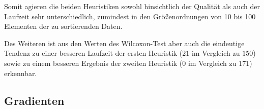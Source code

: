 \documentclass[a4paper, 10pt, twoside, onecolumn, parskip]{scrartcl}
\begin{document}
    Somit agieren die beiden Heuristiken sowohl hinsichtlich der Qualität als auch der Laufzeit sehr unterschiedlich, zumindest in den Größenordnungen von 10 bis 100 Elementen der zu sortierenden Daten.

    Des Weiteren ist aus den Werten des Wilcoxon-Test aber auch die eindeutige Tendenz zu einer besseren Laufzeit der ersten Heuristik ($21$ im Vergleich zu $150$) sowie zu einem besseren Ergebnis der zweiten Heuristik ($0$ im Vergleich zu $171$) erkennbar.

    \newpage
    \appendix
    
    \newpage
    

    \iffalse
    \subsection{Gradienten} \label{subsec:gradienten}
\end{document}

